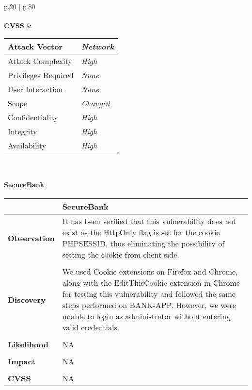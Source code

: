 \begin{longtable*}{p{.20\textwidth} | p{.80\textwidth}}
    \\\\
    \textbf{CVSS} &
      \begin{tabular}{| l | l |}
      \hline
      Attack Vector		& \textit{Network}\\
      \hline
      Attack Complexity	& \textit{High} \\
      \hline
      Privileges Required & \textit{None} \\
      \hline
      User Interaction	& \textit{None} \\
      \hline
      Scope		& \textit{Changed} \\
      \hline
      Confidentiality	& \textit{High} \\
      \hline
      Integrity		& \textit{High} \\
      \hline
      Availability		& \textit{High} \\
      \hline
      \end{tabular}
    \\
    \hline
\end{longtable*}
\paragraph{SecureBank} \mbox{}
\begin{longtable*}{p{.20\textwidth} | p{.80\textwidth}}
    \hline
    & \textbf{SecureBank} \\
    \hline
    \textbf{Observation} &
       It has been verified that this vulnerability does not exist as the HttpOnly flag is set for the cookie PHPSESSID, thus eliminating the possibility of setting the cookie from client side.
    \\\\
    \textbf{Discovery} &
    We used Cookie extensions on Firefox and Chrome, along with the EditThisCookie extension in Chrome for testing this vulnerability and followed the same steps performed on BANK-APP. However, we were unable to login as administrator without entering valid credentials.
    \\\\
    \textbf{Likelihood} &
        NA
    \\\\
    \textbf{Impact} &
        NA
    \\\\
    \textbf{CVSS} &
        NA
    \\
    \hline
\end{longtable*}
\clearpage